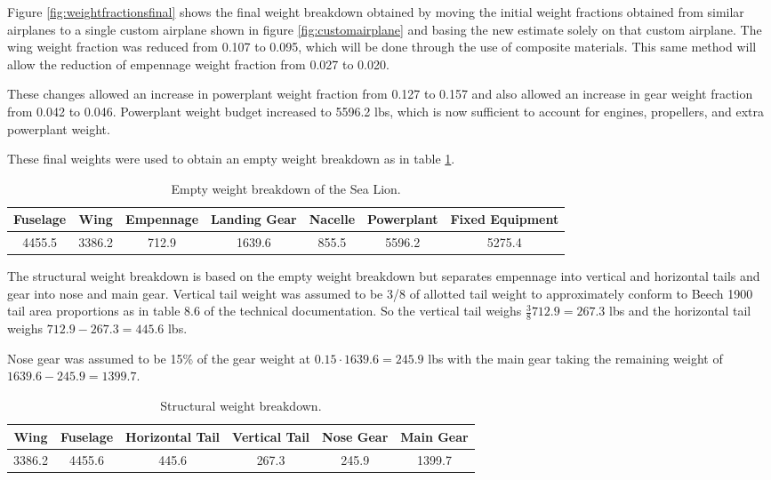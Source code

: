 \documentclass[conf]{new-aiaa}
\begin{document}
Figure \ref{fig:weightfractionsfinal} shows the final weight breakdown obtained by moving the initial weight fractions obtained from similar airplanes to a single custom airplane shown in figure \ref{fig:customairplane} and basing the new estimate solely on that custom airplane. The wing weight fraction was reduced from 0.107 to 0.095, which will be done through the use of composite materials. This same method will allow the reduction of empennage weight fraction from 0.027 to 0.020. 

These changes allowed an increase in powerplant weight fraction from 0.127 to 0.157 and also allowed an increase in gear weight fraction from 0.042 to 0.046. Powerplant weight budget increased to 5596.2 lbs, which is now sufficient to account for engines, propellers, and extra powerplant weight.

These final weights were used to obtain an empty weight breakdown as in table \ref{tab:Empty Weight}.

\begin{table}[H]
\centering
\label{tab:Empty Weight}
\caption{Empty weight breakdown of the Sea Lion.}
\begin{tabular}{|c|c|c|c|c|c|c|}\hline
Fuselage & Wing & Empennage & Landing Gear & Nacelle & Powerplant & Fixed Equipment \\ \hline
4455.5 & 3386.2 & 712.9 & 1639.6 & 855.5 & 5596.2 & 5275.4 \\ \hline
\end{tabular}
\end{table}
The structural weight breakdown is based on the empty weight breakdown but separates empennage into vertical and horizontal tails and gear into nose and main gear. Vertical tail weight was assumed to be 3/8 of allotted tail weight to approximately conform to Beech 1900 tail area proportions as in table 8.6 of the technical documentation\cite{orange_book}. So the vertical tail weighs $\frac{3}{8}712.9=267.3$ lbs and the horizontal tail weighs $712.9-267.3=445.6$ lbs. 

Nose gear was assumed to be 15\%\cite{pres19} of the gear weight at $0.15\cdot1639.6=245.9$ lbs with the main gear taking the remaining weight of $1639.6-245.9=1399.7$. 
\begin{table}[H]
\centering
\label{tab:Structural Weight}
\caption{Structural weight breakdown.}
\begin{tabular}{|c|c|c|c|c|c|}\hline
Wing & Fuselage & Horizontal Tail & Vertical Tail & Nose Gear & Main Gear \\ \hline
3386.2 & 4455.6 & 445.6 & 267.3 & 245.9 & 1399.7 \\ \hline
\end{tabular}
\end{table}
\end{document}
